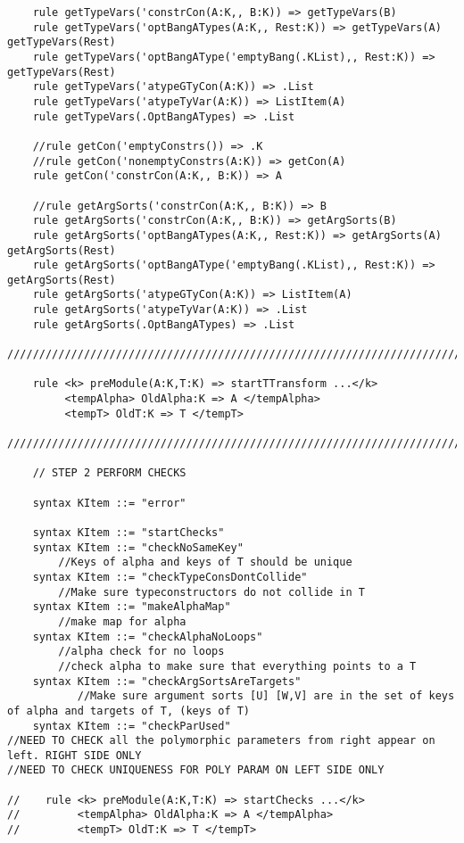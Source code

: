 \begin{lstlisting}
    rule getTypeVars('constrCon(A:K,, B:K)) => getTypeVars(B)
    rule getTypeVars('optBangATypes(A:K,, Rest:K)) => getTypeVars(A) getTypeVars(Rest)
    rule getTypeVars('optBangAType('emptyBang(.KList),, Rest:K)) => getTypeVars(Rest)
    rule getTypeVars('atypeGTyCon(A:K)) => .List
    rule getTypeVars('atypeTyVar(A:K)) => ListItem(A)
    rule getTypeVars(.OptBangATypes) => .List

    //rule getCon('emptyConstrs()) => .K
    //rule getCon('nonemptyConstrs(A:K)) => getCon(A)
    rule getCon('constrCon(A:K,, B:K)) => A

    //rule getArgSorts('constrCon(A:K,, B:K)) => B
    rule getArgSorts('constrCon(A:K,, B:K)) => getArgSorts(B)
    rule getArgSorts('optBangATypes(A:K,, Rest:K)) => getArgSorts(A) getArgSorts(Rest)
    rule getArgSorts('optBangAType('emptyBang(.KList),, Rest:K)) => getArgSorts(Rest)
    rule getArgSorts('atypeGTyCon(A:K)) => ListItem(A)
    rule getArgSorts('atypeTyVar(A:K)) => .List
    rule getArgSorts(.OptBangATypes) => .List

////////////////////////////////////////////////////////////////////////////////////////////////////////////////////////

    rule <k> preModule(A:K,T:K) => startTTransform ...</k>
         <tempAlpha> OldAlpha:K => A </tempAlpha>
         <tempT> OldT:K => T </tempT>

////////////////////////////////////////////////////////////////////////////////////////////////////////////////////////

    // STEP 2 PERFORM CHECKS

    syntax KItem ::= "error"

    syntax KItem ::= "startChecks"
    syntax KItem ::= "checkNoSameKey"
        //Keys of alpha and keys of T should be unique
    syntax KItem ::= "checkTypeConsDontCollide"
        //Make sure typeconstructors do not collide in T
    syntax KItem ::= "makeAlphaMap"
        //make map for alpha
    syntax KItem ::= "checkAlphaNoLoops"
        //alpha check for no loops
        //check alpha to make sure that everything points to a T
    syntax KItem ::= "checkArgSortsAreTargets"
           //Make sure argument sorts [U] [W,V] are in the set of keys of alpha and targets of T, (keys of T)
    syntax KItem ::= "checkParUsed"
//NEED TO CHECK all the polymorphic parameters from right appear on left. RIGHT SIDE ONLY
//NEED TO CHECK UNIQUENESS FOR POLY PARAM ON LEFT SIDE ONLY

//    rule <k> preModule(A:K,T:K) => startChecks ...</k>
//         <tempAlpha> OldAlpha:K => A </tempAlpha>
//         <tempT> OldT:K => T </tempT>



\end{lstlisting}
